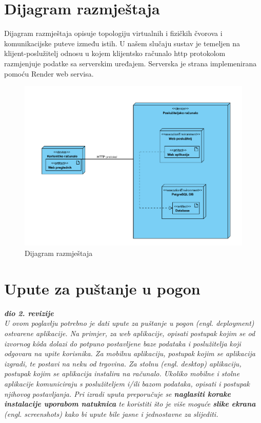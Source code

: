			\eject 
		
		
		\section{Dijagram razmještaja}
			
			 Dijagram razmještaja opisuje topologiju virtualnih i fizičkih čvorova i komunikacijske puteve između istih. U našem slučaju sustav je temeljen na klijent-poslužitelj odnosu u kojem klijentsko računalo http protokolom razmjenjuje podatke sa serverskim uređajem. Serverska je strana implemenirana pomoću Render web servisa.
			 
			 \begin{figure}[H]
			\includegraphics[scale=0.5]{slike/deploymentDiagram.PNG} %
			\centering
			\caption{Dijagram razmještaja}
			\label{fig:implementacija}
		\end{figure}
			
			\eject 
		
		\section{Upute za puštanje u pogon}
		
			\textbf{\textit{dio 2. revizije}}\\
		
			 \textit{U ovom poglavlju potrebno je dati upute za puštanje u pogon (engl. deployment) ostvarene aplikacije. Na primjer, za web aplikacije, opisati postupak kojim se od izvornog kôda dolazi do potpuno postavljene baze podataka i poslužitelja koji odgovara na upite korisnika. Za mobilnu aplikaciju, postupak kojim se aplikacija izgradi, te postavi na neku od trgovina. Za stolnu (engl. desktop) aplikaciju, postupak kojim se aplikacija instalira na računalo. Ukoliko mobilne i stolne aplikacije komuniciraju s poslužiteljem i/ili bazom podataka, opisati i postupak njihovog postavljanja. Pri izradi uputa preporučuje se \textbf{naglasiti korake instalacije uporabom natuknica} te koristiti što je više moguće \textbf{slike ekrana} (engl. screenshots) kako bi upute bile jasne i jednostavne za slijediti.}
			
